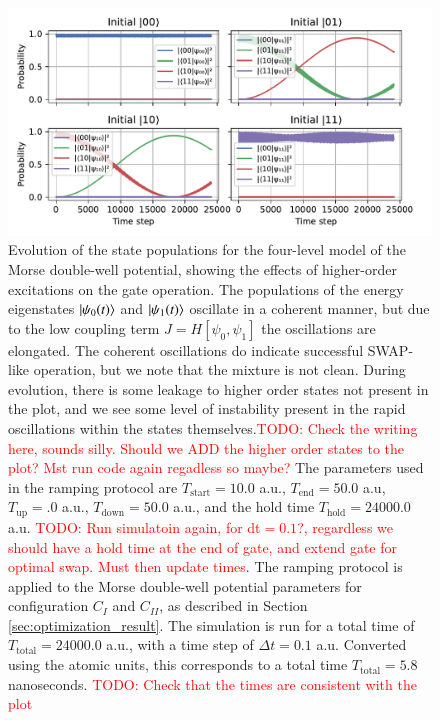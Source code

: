 \documentclass{subfiles}
\begin{document}
\begin{figure}[h!]
    \centering
    \includegraphics[width=1.0\textwidth]{figs/time_evolution_4_basefunctions_1806.pdf}
    \caption{Evolution of the state populations for the four-level model of the Morse double-well potential, showing the effects of higher-order excitations on the gate operation. The populations of the energy eigenstates $\ket{\psi_0(t)}$ and $\ket{\psi_1(t)}$ oscillate in a coherent manner, but due to the low coupling term $J=H[\psi_0, \psi_1]$ the oscillations are elongated. The coherent oscillations do indicate successful SWAP-like operation, but we note that the mixture is not clean. During evolution, there is some leakage to higher order states not present in the plot, and we see some level of instability present in the rapid oscillations within the states themselves.\textcolor{red}{TODO: Check the writing here, sounds silly. Should we ADD the higher order states to the plot? Mst run code again regadless so maybe?} 
    The parameters used in the ramping protocol are $T_{\text{start}} = 10.0$ a.u., $T_{\text{end}} = 50.0$ a.u, $T_{\text{up}} = .0$ a.u., $T_{\text{down}} = 50.0$ a.u., and the hold time $T_{\text{hold}} = 24 000.0$ a.u. \textcolor{red}{TODO: Run simulatoin again, for dt$=0.1$?, regardless we should have a hold time at the end of gate, and extend gate for optimal swap. Must then update times}. The ramping protocol is applied to the Morse double-well potential parameters for configuration $C_I$ and $C_{II}$, as described in Section \ref{sec:optimization_result}. The simulation is run for a total time of $T_{\text{total}} = 24 000.0$ a.u., with a time step of $\Delta t = 0.1$ a.u. Converted using the atomic units, this corresponds to a total time $T_{\text{total}}=5.8$ nanoseconds. \textcolor{red}{TODO: Check that the times are consistent with the plot}
    }
    \label{fig:time_evolution_4_basefunctions}
\end{figure}
\end{document}
